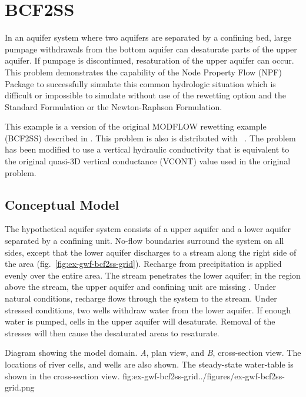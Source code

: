 \section{BCF2SS}

In an aquifer system where two aquifers are separated by a confining bed, large pumpage withdrawals from the bottom aquifer can desaturate parts of the upper aquifer. If pumpage is discontinued, resaturation of the upper aquifer can occur. This problem demonstrates the capability of the Node Property Flow (NPF) Package to successfully simulate this common hydrologic situation which is difficult or impossible to simulate without use of the rewetting option and the Standard Formulation or the Newton-Raphson Formulation.

This example is a version of the original MODFLOW rewetting example (BCF2SS) described in \cite{mcdonaldetal1991wetdry}. This problem is also is distributed with \mff~\citep{modflow2005}. The problem has been modified to use a vertical hydraulic conductivity that is equivalent to the original quasi-3D vertical conductance (VCONT) value used in the original problem.


\subsection{Conceptual Model}

The hypothetical aquifer system consists of a upper aquifer and a lower aquifer separated by a confining unit. No-flow boundaries surround the system on all sides, except that the lower aquifer discharges to a stream along the right side of the area (fig.~\ref{fig:ex-gwf-bcf2ss-grid}). Recharge from precipitation is applied evenly over the entire area. The stream penetrates the lower aquifer; in the region above the stream, the upper aquifer and confining unit are missing  \cite[see][figure~1]{mcdonaldetal1991wetdry}. Under natural conditions, recharge flows through the system to the stream. Under stressed conditions, two wells withdraw water from the lower aquifer. If enough water is pumped, cells in the upper aquifer will desaturate. Removal of the stresses will then cause the desaturated areas to resaturate.


\begin{StandardFigure}{
                                     Diagram showing the model domain. \textit{A}, plan view, and \textit{B}, cross-section 
                                     view. The locations of river cells, and wells are also shown. The steady-state water-table
                                     is shown in the cross-section view.
                                     }{fig:ex-gwf-bcf2ss-grid}{../figures/ex-gwf-bcf2ss-grid.png}
\end{StandardFigure}                                 

